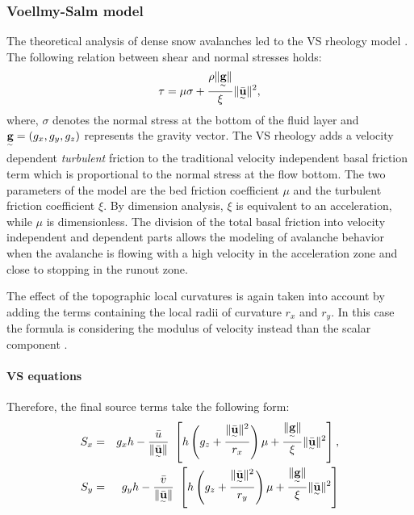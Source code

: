 \documentclass{article}
\begin{document}
\subsubsection{Voellmy-Salm model}\label{VSM}
The theoretical analysis of dense snow avalanches led to the VS rheology model \citep{Voellmy1955, Salm1993}. The following relation between shear and normal stresses holds:
\begin{equation}
\tau = \mu \sigma + \frac{\rho \| \underset{^\sim}{\textbf g} \|}{\xi} \| \underset{^\sim}{\bar{\textbf u}} \|^2,
\end{equation}
where, $\sigma$ denotes the normal stress at the bottom of the fluid layer and $\underset{^\sim}{\textbf g} = (g_{x} , g_{y} , g_{z})$ represents the gravity vector. The VS rheology adds a velocity dependent \emph{turbulent} friction to the traditional velocity independent basal friction term which is proportional to the normal stress at the flow bottom. The two parameters of the model are the bed friction coefficient $\mu$ and the turbulent friction coefficient $\xi$. By dimension analysis, $\xi$ is equivalent to an acceleration, while $\mu$ is dimensionless. The division of the total basal friction into velocity independent and dependent parts allows the modeling of avalanche behavior when the avalanche is flowing with a high velocity in the acceleration zone and close to stopping in the runout zone.

The effect of the topographic local curvatures is again taken into account by adding the terms containing the local radii of curvature $r_x$ and $r_y$. In this case the formula is considering the modulus of velocity instead than the scalar component \citep{Fischer2012}.

\paragraph{VS equations} Therefore, the final source terms take the following form:
\begin{eqnarray}
\label{eq:S_terms_curv}
S_{x} &=&  g_{x} h - \frac{\bar{u}}{\| \underset{^\sim}{\bar{\textbf u}}\|} \ \left[ h \left(g_{z} + \frac{\| \underset{^\sim}{\bar{\textbf u}} \|^2}{r_{x}} \right)\mu+ \frac{\| \underset{^\sim}{\textbf g} \|}{\xi}\| \underset{^\sim}{\bar{\textbf u}} \|^2\right], \nonumber \\
S_{y} &=& g_{y} h - \frac{\bar{v}}{\| \underset{^\sim}{\bar{\textbf u}}\|} \ \left[ h \left(g_{z} + \frac{\| \underset{^\sim}{\bar{\textbf u}} \|^2}{r_{y}} \right)\mu+ \frac{\| \underset{^\sim}{\textbf g} \|}{\xi}\| \underset{^\sim}{\bar{\textbf u}} \|^2\right]
\end{eqnarray}
\end{document}
